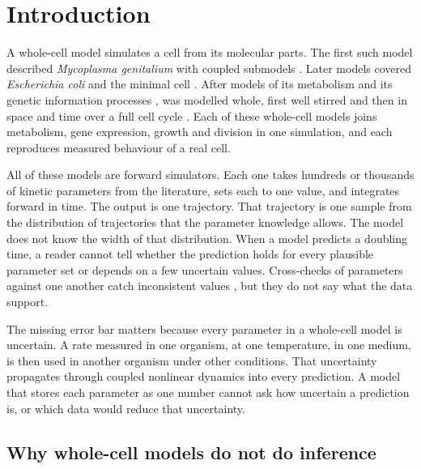 \section{Introduction}
\label{sec:intro}

A whole-cell model simulates a cell from its molecular parts. The first such model
described \textit{Mycoplasma genitalium} with  coupled submodels
\cite{karr2012whole}. Later models covered \textit{Escherichia coli}
\cite{macklin2020simultaneous} and the minimal cell \syn{} \cite{hutchison2016design,breuer2019essential}. After
models of its metabolism \cite{breuer2019essential} and its genetic information processes
\cite{thornburg2019kinetic}, \syn{} was modelled whole, first well stirred
\cite{thornburg2022fundamental} and then in space and time over a full cell cycle
\cite{thornburg2026bringing}. Each of these whole-cell models joins
metabolism, gene expression, growth and division in one simulation, and each
reproduces measured behaviour of a real cell.

All of these models are forward simulators. Each one takes hundreds or thousands of kinetic
parameters from the literature, sets each to one value, and integrates forward in
time. The output is one trajectory. That trajectory is one sample from the
distribution of trajectories that the parameter knowledge allows. The model does not
know the width of that distribution. When a model predicts a doubling time, a reader
cannot tell whether the prediction holds for every plausible parameter set or depends on a few uncertain values. Cross-checks of parameters against one another catch inconsistent values \cite{macklin2020simultaneous}, but they do not say what the data support.

The missing error bar matters because every parameter in a whole-cell model is
uncertain. A rate measured in one organism, at one temperature,
in one medium, is then used in another organism under other conditions. That
uncertainty propagates through coupled nonlinear dynamics into every prediction. A model
that stores each parameter as one number cannot ask how uncertain a prediction is, or
which data would reduce that uncertainty.

\subsection{Why whole-cell models do not do inference}

